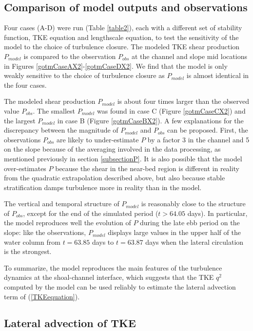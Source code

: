 \subsection{Comparison of model outputs and observations}

Four cases (A-D) were run (Table \ref{table2}), each with a different set of stability function, TKE equation and lengthscale equation, to test the sensitivity of the model to the choice of turbulence closure. The modeled TKE shear production $P_{model}$ is compared to the observation $P_{obs}$ at the channel and slope mid locations in Figures \ref{gotmCaseAX2}-\ref{gotmCaseDX2}. We find that the model is only weakly sensitive to the choice of turbulence closure as $P_{model}$ is almost identical in the four cases.

The modeled shear production $P_{model}$ is about four times larger than the observed value $P_{obs}$. The smallest $P_{model}$ was found in case C (Figure \ref{gotmCaseCX2}) and the largest $P_{model}$ in case B (Figure \ref{gotmCaseBX2}). A few explanations for the discrepancy between the magnitude of $P_{model}$ and $P_{obs}$ can be proposed. First, the observations $P_{obs}$ are likely to under-estimate $P$ by a factor 3 in the channel and 5 on the slope because of the averaging involved in the data processing, as mentioned previously in section \ref{subsectionP}. It is also possible that the model over-estimates $P$ because the shear in the near-bed region is different in reality from the quadratic extrapolation described above, but also because stable stratification damps turbulence more in reality than in the model. 

The vertical and temporal structure of $P_{model}$ is reasonably close to the structure of $P_{obs}$, except for the end of the simulated period ($t > 64.05$ days). In particular, the model reproduces well the evolution of $P$ during the late ebb period on the slope: like the observations, $P_{model}$ displays large values in the upper half of the water column from $t=63.85$ days  to $t=63.87$ days when the lateral circulation is the strongest. 

To summarize, the model reproduces the main features of the turbulence dynamics at the shoal-channel interface, which suggests that the TKE $q^2$ computed by the model can be used reliably to estimate the lateral advection term of (\ref{TKEequation}).

\subsection{Lateral advection of TKE}


